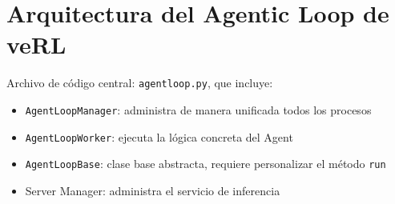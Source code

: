 \section{Arquitectura del Agentic Loop de veRL}
Archivo de código central: \texttt{agentloop.py}, que incluye:
\begin{itemize}
  \item \texttt{AgentLoopManager}: administra de manera unificada todos los procesos
  \item \texttt{AgentLoopWorker}: ejecuta la lógica concreta del Agent
  \item \texttt{AgentLoopBase}: clase base abstracta, requiere personalizar el método \texttt{run}
  \item Server Manager: administra el servicio de inferencia
\end{itemize}

